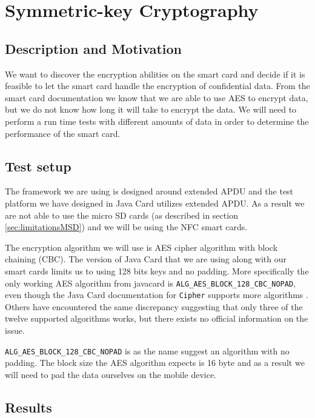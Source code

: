 \section{Symmetric-key Cryptography}
\label{sec:symmetricTest}
\subsection{Description and Motivation}
We want to discover the encryption abilities on the smart card and decide if it is feasible to let the smart card handle the encryption of confidential data. From the smart card documentation we know that we are able to use AES to encrypt data, but we do not know how long it will take to encrypt the data. We will need to perform a run time tests with different amounts of data in order to determine the performance of the smart card.

\subsection{Test setup}
The framework we are using is designed around extended APDU and the test platform we have designed in Java Card utilizes extended APDU. As a result we are not able to use the micro SD cards (as described in section \ref{sec:limitationsMSD}) and we will be using the NFC smart cards.

The encryption algorithm we will use is AES cipher algorithm with block chaining (CBC). The version of Java Card that we are using along with our smart cards limits us to using 128 bits keys and no padding. More specifically the only working AES algorithm from javacard is \texttt{ALG\_AES\_BLOCK\_128\_CBC\_NOPAD}, even though the Java Card documentation for \texttt{Cipher} supports more algorithms \cite{javacardCipher}. Others have encountered the same discrepancy \cite{javacardCipherFail} suggesting that only three of the twelve supported algorithms works, but there exists no official information on the issue.

\texttt{ALG\_AES\_BLOCK\_128\_CBC\_NOPAD} is as the name suggest an algorithm with no padding. The block size the AES algorithm expects is 16 byte and as a result we will need to pad the data ourselves on the mobile device.

\subsection{Results}


